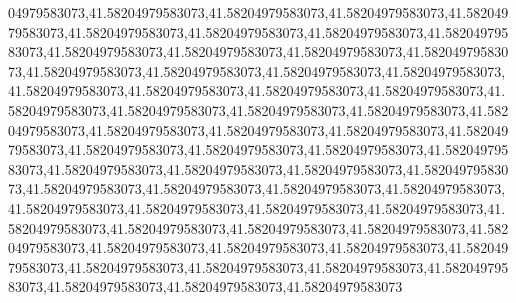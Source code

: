04979583073,41.58204979583073,41.58204979583073,41.58204979583073,41.58204979583073,41.58204979583073,41.58204979583073,41.58204979583073,41.58204979583073,41.58204979583073,41.58204979583073,41.58204979583073,41.58204979583073,41.58204979583073,41.58204979583073,41.58204979583073,41.58204979583073,41.58204979583073,41.58204979583073,41.58204979583073,41.58204979583073,41.58204979583073,41.58204979583073,41.58204979583073,41.58204979583073,41.58204979583073,41.58204979583073,41.58204979583073,41.58204979583073,41.58204979583073,41.58204979583073,41.58204979583073,41.58204979583073,41.58204979583073,41.58204979583073,41.58204979583073,41.58204979583073,41.58204979583073,41.58204979583073,41.58204979583073,41.58204979583073,41.58204979583073,41.58204979583073,41.58204979583073,41.58204979583073,41.58204979583073,41.58204979583073,41.58204979583073,41.58204979583073,41.58204979583073,41.58204979583073,41.58204979583073,41.58204979583073,41.58204979583073,41.58204979583073,41.58204979583073,41.58204979583073,41.58204979583073,41.58204979583073,41.58204979583073,41.58204979583073,41.58204979583073
